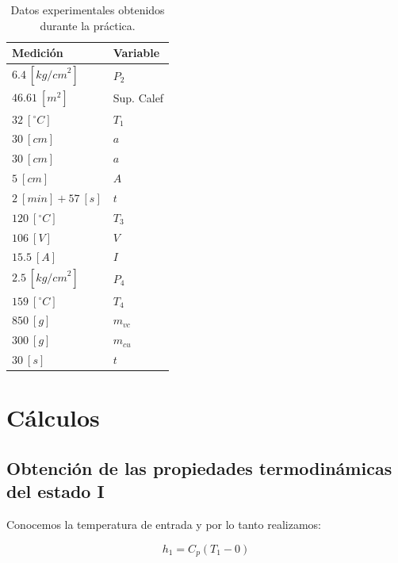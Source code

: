 \documentclass[12pt,letterpaper]{article}
\begin{document}
\begin{table}[H] \label{tab:data}
\centering
\renewcommand{\arraystretch}{1.4}
    \begin{tabular}{|l|l|}
    \hline
    \textbf{Medición} & \textbf{Variable} \\
    \hline
    $6.4\ [{kg/cm}^2]$   & $P_2$ \\
    \hline
    $46.61\ [{m}^2]$     & Sup. Calef \\
    \hline
    $32\ [^\circ{C}]$    & $T_1$ \\
    \hline
    $30\ [{cm}]$ & $a$ \\
    \hline
    $30\ [{cm}]$ & $a$ \\
    \hline
    $5\ [{cm}]$  & $A$ \\
    \hline
    $2\ [min] + 57\ [s]$  & $t$ \\
    \hline
    $120\ [^\circ{C}]$   & $T_3$ \\
    \hline
    $106\ [{V}]$         & $V$ \\
    \hline
    $15.5\ [{A}]$        & $I$ \\
    \hline
    $2.5\ [{kg/cm}^2]$   & $P_4$ \\
    \hline
    $159\ [^\circ{C}]$   & $T_4$ \\
    \hline
    $850\ [{g}]$         & $m_{vc}$ \\
    \hline
    $300\ [{g}]$         & $m_{cu}$ \\
    \hline
    $30\ [{s}]$          & $t$ \\
    \hline
    \end{tabular}
\caption{Datos experimentales obtenidos durante la práctica.}
\end{table}

\section{Cálculos}

\subsection{Obtención de las propiedades termodinámicas del estado I} \label{entalpia_I}
Conocemos la temperatura de entrada y por lo tanto realizamos:

\begin{equation} \label{eq:cp_equation}
    h_{1}=C_p (T_1 - 0)
\end{equation}
\end{document}
